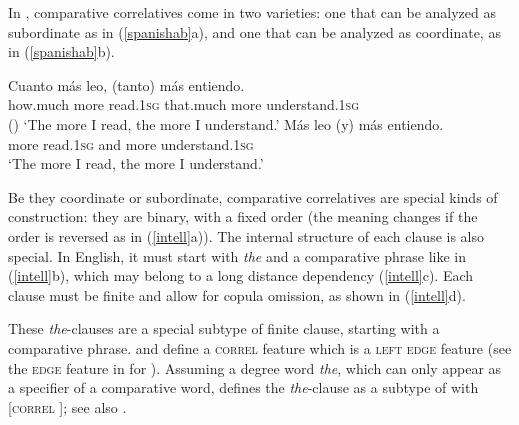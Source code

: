 In , comparative correlatives come in two varieties: one that can be analyzed as subordinate
as in (\ref{spanishab}a), 
 and one that can be analyzed as coordinate, as in (\ref{spanishab}b).

\eal
\label{spanishab}
\ex 
\gll Cuanto   m\'{a}s leo,     (tanto)        m\'{a}s entiendo. \\
     how.much more    read.1\textsc{sg} that.much more understand.1\textsc{sg} \\\hfill{()}
\glt `The more I read, the more I understand.'
\ex 
\gll	M\'{a}s leo        (y) m\'{a}s entiendo. \\
	more read.1\textsc{sg} and more understand.1\textsc{sg} \\
\glt `The more I read, the more I understand.'\\ 
 \citep[]{Abeille:Borsley:Espinal:06}
\zl

Be they coordinate or subordinate, comparative correlatives are special kinds of construction: they are binary, with a fixed order (the meaning changes if the order is reversed
as in (\ref{intell}a)).
The internal structure of each clause is also special. In English, it must start with \emph{the} and a comparative phrase like in (\ref{intell}b), which may belong to a long distance dependency 
(\ref{intell}c). Each clause must be finite and allow for copula omission, as shown in (\ref{intell}d).

\eal
\label{intell}
\zl

These \emph{the}-clauses  are a special subtype of finite clause, starting with a comparative
phrase. \citet[]{Abeille:Borsley:Espinal:06} and \citet[]{Borsley:11} 
define a \textsc{correl} feature which is a \textsc{left edge} feature (see the \textsc{edge}
feature in \citealt{Bonami:2004} for  ). Assuming a degree word \textit{the}, which can only appear as a specifier of
a comparative word, \citet[]{Borsley:11}  defines the \textit{the}-clause as a subtype of  with [\textsc{correl} ]; see also \citet[]{fgsag08}.

